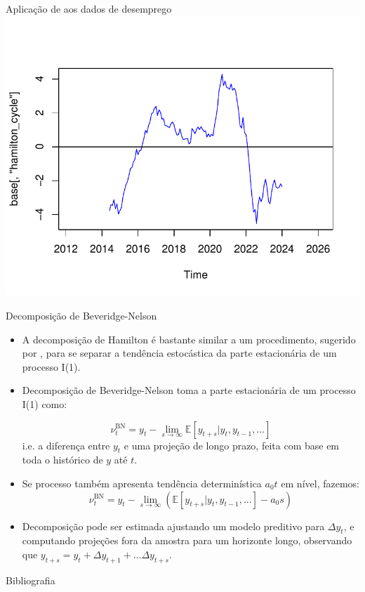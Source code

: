 \documentclass[11pt]{beamer}
\begin{document}
\begin{frame}{Aplicação de \citet{Hamilton2019} aos dados de desemprego}
	\centering
	\includegraphics[scale=0.7]{graficos/hamilton.pdf}
\end{frame}

\begin{frame}{Decomposição de Beveridge-Nelson}
	\begin{itemize}
		\item A decomposição de Hamilton é bastante similar a um procedimento, sugerido por \citet{Beveridge1981}, para se separar a tendência estocástica da parte estacionária de um processo I(1).
		\item Decomposição de Beveridge-Nelson toma a parte estacionária de um processo I(1) como:
		
		$$\nu^{\text{BN}}_t = y_t - \lim_{s \to \infty} \mathbb{E}[y_{t+s}|y_t,y_{t-1},\ldots]$$
		i.e. a diferença entre $y_t$ e uma projeção de longo prazo, feita com base em toda o histórico de $y$ até $t$.
		\item Se processo também apresenta tendência determinística $a_0 t$ em nível, fazemos: 
			$$\nu^{\text{BN}}_t = y_t - \lim_{s \to \infty} ( \mathbb{E}[y_{t+s}|y_t,y_{t-1},\ldots] - a_0 s)$$
			\item Decomposição pode ser estimada ajustando um modelo preditivo para $\Delta y_t$, e computando projeções fora da amostra para um horizonte longo, observando que $y_{t+s} = y_t + \Delta y_{t+1} + \ldots \Delta y_{t+s}$.
	\end{itemize}
\end{frame}
\appendix
	\begin{frame}[allowframebreaks]{Bibliografia}
	\printbibliography
	\end{frame}
\end{document}

